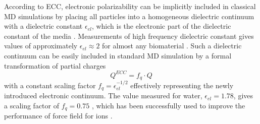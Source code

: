 \documentclass[aip,jcp,twocolumn]{revtex4}
\begin{document}
According to ECC, electronic
polarizability can be implicitly included in classical MD simulations by
placing all particles into a homogeneous dielectric continuum 
with a dielectric constant $\epsilon _{el}$, 
which is the electronic part of the dielectric constant of 
the media \cite{leontyev11}. Measurements of high frequency 
dielectric constant gives values of approximately $\epsilon _{el} \approx 2$ 
for almost any biomaterial \cite{some_original_work, leontyev11}.
Such a dielectric continuum can be easily included in standard MD simulation by
a formal transformation of partial charges 
\begin{equation}
  Q^{ECC} = f_q \cdot Q
\end{equation}
with a constant scaling factor $f_q = \epsilon _{el} ^{-1/2}$ 
effectively representing the newly introduced electronic continuum. 
The value measured for water, $\epsilon _{el} = 1.78$, gives 
a scaling factor of $f_q = 0.75$ \cite{some_orig_source, leontyev11}, which has been
successfully used to improve the performance of force field for ions \cite{kohagen14,kohagen16,??}. 
\end{document}
